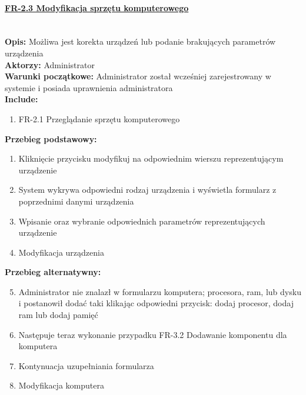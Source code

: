 \paragraph{\underline{FR-2.3 Modyfikacja sprzętu komputerowego}}\mbox{}\\[1mm]
	\noindent\textbf{Opis:} Możliwa jest korekta urządzeń lub podanie brakujących parametrów urządzenia\\
	\noindent\textbf{Aktorzy:} Administrator\\
	\textbf{Warunki początkowe:} Administrator został wcześniej zarejestrowany w systemie i posiada uprawnienia administratora\\
	\textbf{Include:} 
	\begin{enumerate}[noparskip]
		\item FR-2.1 Przeglądanie sprzętu komputerowego
	\end{enumerate}
	\textbf{Przebieg podstawowy:}
	\begin{enumerate}[noparskip]
    \item Kliknięcie przycisku modyfikuj na odpowiednim wierszu reprezentującym urządzenie
	  \item System wykrywa odpowiedni rodzaj urządzenia i wyświetla formularz z poprzednimi danymi urządzenia
	  \item Wpisanie oraz wybranie odpowiednich parametrów reprezentujących urządzenie
	  \item Modyfikacja urządzenia
	\end{enumerate} 
	\textbf{Przebieg alternatywny:}
	\begin{enumerate}[noparskip]\setcounter{enumi}{4}
		\item Administrator nie znalazł w formularzu komputera; procesora, ram, lub dysku i postanowił dodać taki klikając odpowiedni przycisk: dodaj procesor, dodaj ram lub dodaj pamięć
		\item Następuje teraz wykonanie przypadku FR-3.2 Dodawanie komponentu dla komputera
		\item Kontynuacja uzupełniania formularza
		\item Modyfikacja komputera
	\end{enumerate} 
